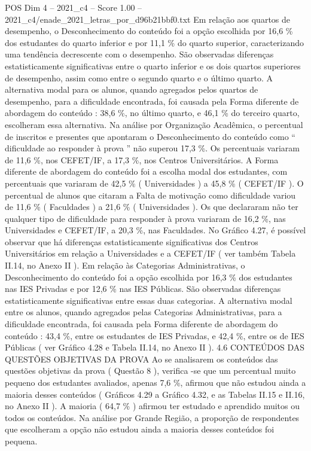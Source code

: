 \begin{textsample}{POS Dim 4 – 2021\_c4 – Score 1.00 – 2021\_c4/enade\_2021\_letras\_por\_d96b21bbf0.txt}
Em relação aos quartos de desempenho, o Desconhecimento do conteúdo foi a opção escolhida por 16,6 \% dos estudantes do quarto inferior e por 11,1 \% do quarto superior, caracterizando uma tendência decrescente com o desempenho.
São observadas diferenças estatisticamente significativas entre o quarto inferior e os dois quartos superiores de desempenho, assim como entre o segundo quarto e o último quarto.
A alternativa modal para os alunos, quando agregados pelos quartos de desempenho, para a dificuldade encontrada, foi causada pela Forma diferente de abordagem do conteúdo : 38,6 \%, no último quarto, e 46,1 \% do terceiro quarto, escolheram essa alternativa.
Na análise por Organização Acadêmica, o percentual de inscritos e presentes que apontaram o Desconhecimento do conteúdo como “ dificuldade ao responder à prova ” não superou 17,3 \%.
Os percentuais variaram de 11,6 \%, nos CEFET/IF, a 17,3 \%, nos Centros Universitários.
A Forma diferente de abordagem do conteúdo foi a escolha modal dos estudantes, com percentuais que variaram de 42,5 \% ( Universidades ) a 45,8 \% ( CEFET/IF ).
O percentual de alunos que citaram a Falta de motivação como dificuldade variou de 11,6 \% ( Faculdades ) a 21,6 \% ( Universidades ).
Os que declararam não ter qualquer tipo de dificuldade para responder à prova variaram de 16,2 \%, nas Universidades e CEFET/IF, a 20,3 \%, nas Faculdades.
No Gráfico 4.27, é possível observar que há diferenças estatisticamente significativas dos Centros Universitários em relação a Universidades e a CEFET/IF ( ver também Tabela II.14, no Anexo II ).
Em relação às Categorias Administrativas, o Desconhecimento do conteúdo foi a opção escolhida por 16,3 \% dos estudantes nas IES Privadas e por 12,6 \% nas IES Públicas.
São observadas diferenças estatisticamente significativas entre essas duas categorias.
A alternativa modal entre os alunos, quando agregados pelas Categorias Administrativas, para a dificuldade encontrada, foi causada pela Forma diferente de abordagem do conteúdo : 43,4 \%, entre os estudantes de IES Privadas, e 42,4 \%, entre os de IES Públicas ( ver Gráfico 4.28 e Tabela II.14, no Anexo II ). 4.6 CONTEÚDOS DAS QUESTÕES OBJETIVAS DA PROVA Ao se analisarem os conteúdos das questões objetivas da prova ( Questão 8 ), verifica -se que um percentual muito pequeno dos estudantes avaliados, apenas 7,6 \%, afirmou que não estudou ainda a maioria desses conteúdos ( Gráficos 4.29 a Gráfico 4.32, e as Tabelas II.15 e II.16, no Anexo II ).
A maioria ( 64,7 \% ) afirmou ter estudado e aprendido muitos ou todos os conteúdos.
Na análise por Grande Região, a proporção de respondentes que escolheram a opção não estudou ainda a maioria desses conteúdos foi pequena.

\end{textsample}
